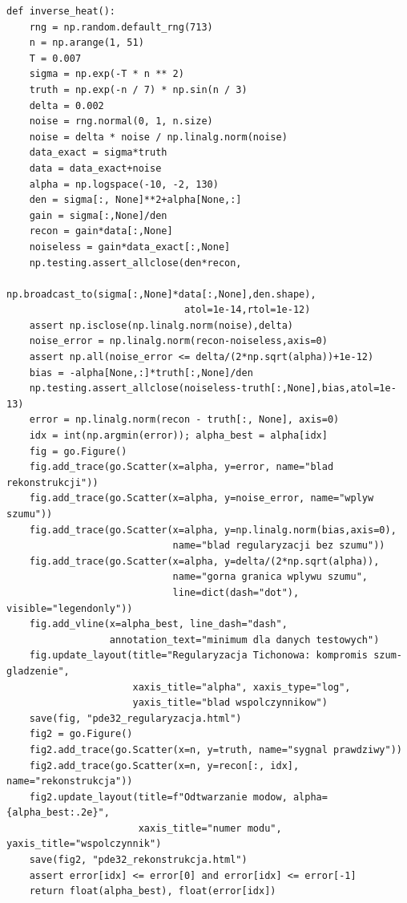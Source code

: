\begin{lstlisting}[style=pythonpde,caption={Eksperymenty rozdziału 32 (Python i Plotly)},label={code:pde32-plotly}]
def inverse_heat():
    rng = np.random.default_rng(713)
    n = np.arange(1, 51)
    T = 0.007
    sigma = np.exp(-T * n ** 2)
    truth = np.exp(-n / 7) * np.sin(n / 3)
    delta = 0.002
    noise = rng.normal(0, 1, n.size)
    noise = delta * noise / np.linalg.norm(noise)
    data_exact = sigma*truth
    data = data_exact+noise
    alpha = np.logspace(-10, -2, 130)
    den = sigma[:, None]**2+alpha[None,:]
    gain = sigma[:,None]/den
    recon = gain*data[:,None]
    noiseless = gain*data_exact[:,None]
    np.testing.assert_allclose(den*recon,
                               np.broadcast_to(sigma[:,None]*data[:,None],den.shape),
                               atol=1e-14,rtol=1e-12)
    assert np.isclose(np.linalg.norm(noise),delta)
    noise_error = np.linalg.norm(recon-noiseless,axis=0)
    assert np.all(noise_error <= delta/(2*np.sqrt(alpha))+1e-12)
    bias = -alpha[None,:]*truth[:,None]/den
    np.testing.assert_allclose(noiseless-truth[:,None],bias,atol=1e-13)
    error = np.linalg.norm(recon - truth[:, None], axis=0)
    idx = int(np.argmin(error)); alpha_best = alpha[idx]
    fig = go.Figure()
    fig.add_trace(go.Scatter(x=alpha, y=error, name="blad rekonstrukcji"))
    fig.add_trace(go.Scatter(x=alpha, y=noise_error, name="wplyw szumu"))
    fig.add_trace(go.Scatter(x=alpha, y=np.linalg.norm(bias,axis=0),
                             name="blad regularyzacji bez szumu"))
    fig.add_trace(go.Scatter(x=alpha, y=delta/(2*np.sqrt(alpha)),
                             name="gorna granica wplywu szumu",
                             line=dict(dash="dot"), visible="legendonly"))
    fig.add_vline(x=alpha_best, line_dash="dash",
                  annotation_text="minimum dla danych testowych")
    fig.update_layout(title="Regularyzacja Tichonowa: kompromis szum-gladzenie",
                      xaxis_title="alpha", xaxis_type="log",
                      yaxis_title="blad wspolczynnikow")
    save(fig, "pde32_regularyzacja.html")
    fig2 = go.Figure()
    fig2.add_trace(go.Scatter(x=n, y=truth, name="sygnal prawdziwy"))
    fig2.add_trace(go.Scatter(x=n, y=recon[:, idx], name="rekonstrukcja"))
    fig2.update_layout(title=f"Odtwarzanie modow, alpha={alpha_best:.2e}",
                       xaxis_title="numer modu", yaxis_title="wspolczynnik")
    save(fig2, "pde32_rekonstrukcja.html")
    assert error[idx] <= error[0] and error[idx] <= error[-1]
    return float(alpha_best), float(error[idx])



\end{lstlisting}
